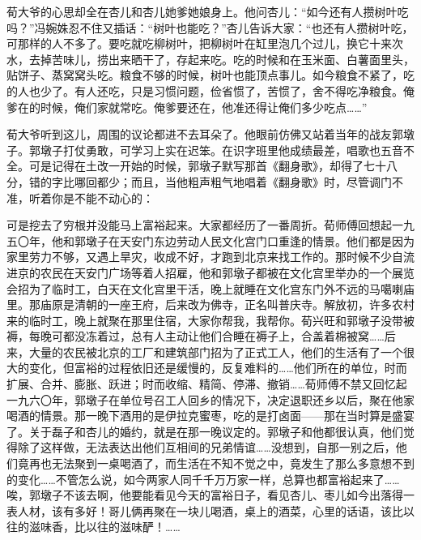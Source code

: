 \par 荀大爷的心思却全在杏儿和杏儿她爹她娘身上。他问杏儿：“如今还有人攒树叶吃吗？”冯婉姝忍不住又插话：“树叶也能吃？”杏儿告诉大家：“也还有人攒树叶吃，可那样的人不多了。要吃就吃柳树叶，把柳树叶在缸里泡几个过儿，换它十来次水，去掉苦味儿，捞出来晒干了，存起来吃。吃的时候和在玉米面、白薯面里头，贴饼子、蒸窝窝头吃。粮食不够的时候，树叶也能顶点事儿。如今粮食不紧了，吃的人也少了。有人还吃，只是习惯问题，俭省惯了，苦惯了，舍不得吃净粮食。俺爹在的时候，俺们家就常吃。俺爹要还在，他准还得让俺们多少吃点……”
\par 荀大爷听到这儿，周围的议论都进不去耳朵了。他眼前仿佛又站着当年的战友郭墩子。郭墩子打仗勇敢，可学习上实在迟笨。在识字班里他成绩最差，唱歌也五音不全。可是记得在土改一开始的时候，郭墩子默写那首《翻身歌》，却得了七十八分，错的字比哪回都少；而且，当他粗声粗气地唱着《翻身歌》时，尽管调门不准，听着你是不能不动心的：
\par 可是挖去了穷根并没能马上富裕起来。大家都经历了一番周折。荀师傅回想起一九五〇年，他和郭墩子在天安门东边劳动人民文化宫门口重逢的情景。他们都是因为家里劳力不够，又遇上旱灾，收成不好，才跑到北京来找工作的。那时候不少自流进京的农民在天安门广场等着人招雇，他和郭墩子都被在文化宫里举办的一个展览会招为了临时工，白天在文化宫里干活，晚上就睡在文化宫东门外不远的马噶喇庙里。那庙原是清朝的一座王府，后来改为佛寺，正名叫普庆寺。解放初，许多农村来的临时工，晚上就聚在那里住宿，大家你帮我，我帮你。荀兴旺和郭墩子没带被褥，每晚可都没冻着过，总有人主动让他们合睡在褥子上，合盖着棉被窝……后来，大量的农民被北京的工厂和建筑部门招为了正式工人，他们的生活有了一个很大的变化，但富裕的过程依旧还是缓慢的，反复难料的……他们所在的单位，时而扩展、合并、膨胀、跃进；时而收缩、精简、停滞、撤销……荀师傅不禁又回忆起一九六〇年，郭墩子在单位号召工人回乡的情况下，决定退职还乡以后，聚在他家喝酒的情景。那一晚下酒用的是伊拉克蜜枣，吃的是打卤面——那在当时算是盛宴了。关于磊子和杏儿的婚约，就是在那一晚议定的。郭墩子和他都很认真，他们觉得除了这样做，无法表达出他们互相间的兄弟情谊……没想到，自那一别之后，他们竟再也无法聚到一桌喝酒了，而生活在不知不觉之中，竟发生了那么多意想不到的变化……不管怎么说，如今两家人同千千万万家一样，总算也都富裕起来了……唉，郭墩子不该去啊，他要能看见今天的富裕日子，看见杏儿、枣儿如今出落得一表人材，该有多好！哥儿俩再聚在一块儿喝酒，桌上的酒菜，心里的话语，该比以往的滋味香，比以往的滋味酽！……
